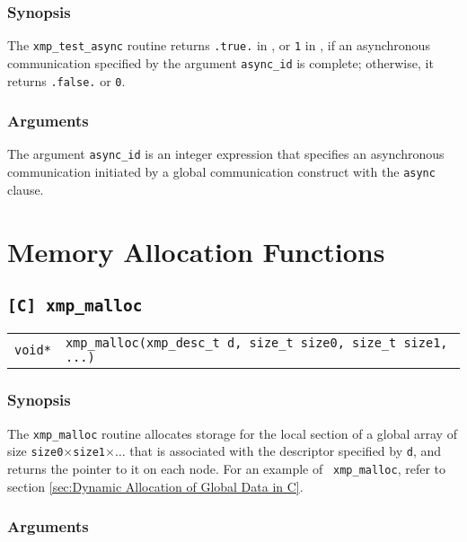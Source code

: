\subsubsection*{Synopsis}

The {\tt xmp\_test\_async} routine returns {\tt .true.} in {\XMPF}, or
{\tt 1} in {\XMPC}, if an asynchronous communication specified by the
argument {\tt async\_id} is complete; otherwise, it returns {\tt .false.}
or {\tt 0}.

\subsubsection*{Arguments}

The argument {\tt async\_id} is an integer expression that specifies an
asynchronous communication initiated by a global communication construct
with the {\tt async} clause.


\section{Memory Allocation Functions}

\subsection{\tt [C] xmp\_malloc} \label{subsec: xmp_malloc}

\begin{tabular}{ll}

{\tt void*} & {\tt xmp\_malloc(xmp\_desc\_t d, size\_t size0, size\_t
  size1, ...)}

\end{tabular}

\subsubsection*{Synopsis}

The {\tt xmp\_malloc} routine allocates storage for the local section
of a global array of size {\tt size0}$\times${\tt size1}$\times\ldots$
that is associated with the descriptor specified by {\tt d}, 
%
and returns the pointer to it on each node. For an example of {\tt
xmp\_malloc}, refer to section \ref{sec:Dynamic Allocation of Global Data in C}.

\subsubsection*{Arguments}

